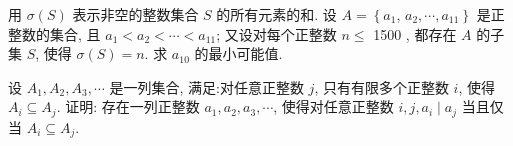 \documentclass[aspectratio=169]{ctexbeamer}
\begin{document}

\begin{frame}
用 $\sigma(S)$ 表示非空的整数集合 $S$ 的所有元素的和. 设 $A=\left\{a_{1}\right.$, $\left.a_{2}, \cdots, a_{11}\right\}$ 是正整数的集合, 且 $a_{1}<a_{2}<\cdots<a_{11}$; 又设对每个正整数 $n \leqslant$ 1500 , 都存在 $A$ 的子集 $S$, 使得 $\sigma(S)=n$. 求 $a_{10}$ 的最小可能值.
\end{frame}

\begin{frame}
设 $A_{1}, A_{2}, A_{3}, \cdots$ 是一列集合, 满足:对任意正整数 $j$, 只有有限多个正整数 $i$, 使得 $A_{i} \subseteq A_{j}$. 证明: 存在一列正整数 $a_{1}, a_{2}, a_{3}, \cdots$, 使得对任意正整数 $i ,  j, a_{i} \mid a_{j}$ 当且仅当 $A_{i} \subseteq A_{j}$.
\end{frame}

\end{document}
